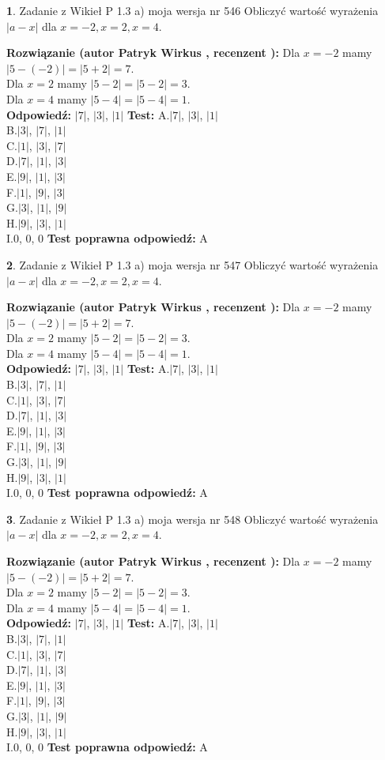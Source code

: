 \documentclass[12pt, a4paper]{article}
\theoremstyle{definition} %
\newtheorem{zad}{}
\newcommand{\zadStart}[1]{\begin{zad}#1\newline}
\newcommand{\zadStop}{\end{zad}}
\newcommand{\rozwStart}[2]{\noindent \textbf{Rozwiązanie (autor #1 , recenzent #2): }\newline}
\newcommand{\rozwStop}{\newline}
\newcommand{\odpStart}{\noindent \textbf{Odpowiedź:}\newline}
\newcommand{\odpStop}{\newline}
\newcommand{\testStart}{\noindent \textbf{Test:}\newline}
\newcommand{\testStop}{\newline}
\newcommand{\kluczStart}{\noindent \textbf{Test poprawna odpowiedź:}\newline}
\newcommand{\kluczStop}{\newline}
\begin{document}
\zadStart{Zadanie z Wikieł P 1.3 a) moja wersja nr 546}
Obliczyć wartość wyrażenia $|a - x|$ dla $x=-2,x=2,x=4$.
\zadStop
\rozwStart{Patryk Wirkus}{}
Dla $x = -2$ mamy $|5 - (-2)| = |5 + 2| = 7$.\\
Dla $x = 2$ mamy $|5 - 2| = |5 - 2| = 3$.\\
Dla $x = 4$ mamy $|5 - 4| = |5 - 4| = 1$.\\
\rozwStop
\odpStart
$|7|$, $|3|$, $|1|$
\odpStop
\testStart
A.$|7|$, $|3|$, $|1|$\\
B.$|3|$, $|7|$, $|1|$\\
C.$|1|$, $|3|$, $|7|$\\
D.$|7|$, $|1|$, $|3|$\\
E.$|9|$, $|1|$, $|3|$\\
F.$|1|$, $|9|$, $|3|$\\
G.$|3|$, $|1|$, $|9|$\\
H.$|9|$, $|3|$, $|1|$\\
I.$0$, $0$, $0$
\testStop
\kluczStart
A
\kluczStop



\zadStart{Zadanie z Wikieł P 1.3 a) moja wersja nr 547}
Obliczyć wartość wyrażenia $|a - x|$ dla $x=-2,x=2,x=4$.
\zadStop
\rozwStart{Patryk Wirkus}{}
Dla $x = -2$ mamy $|5 - (-2)| = |5 + 2| = 7$.\\
Dla $x = 2$ mamy $|5 - 2| = |5 - 2| = 3$.\\
Dla $x = 4$ mamy $|5 - 4| = |5 - 4| = 1$.\\
\rozwStop
\odpStart
$|7|$, $|3|$, $|1|$
\odpStop
\testStart
A.$|7|$, $|3|$, $|1|$\\
B.$|3|$, $|7|$, $|1|$\\
C.$|1|$, $|3|$, $|7|$\\
D.$|7|$, $|1|$, $|3|$\\
E.$|9|$, $|1|$, $|3|$\\
F.$|1|$, $|9|$, $|3|$\\
G.$|3|$, $|1|$, $|9|$\\
H.$|9|$, $|3|$, $|1|$\\
I.$0$, $0$, $0$
\testStop
\kluczStart
A
\kluczStop



\zadStart{Zadanie z Wikieł P 1.3 a) moja wersja nr 548}
Obliczyć wartość wyrażenia $|a - x|$ dla $x=-2,x=2,x=4$.
\zadStop
\rozwStart{Patryk Wirkus}{}
Dla $x = -2$ mamy $|5 - (-2)| = |5 + 2| = 7$.\\
Dla $x = 2$ mamy $|5 - 2| = |5 - 2| = 3$.\\
Dla $x = 4$ mamy $|5 - 4| = |5 - 4| = 1$.\\
\rozwStop
\odpStart
$|7|$, $|3|$, $|1|$
\odpStop
\testStart
A.$|7|$, $|3|$, $|1|$\\
B.$|3|$, $|7|$, $|1|$\\
C.$|1|$, $|3|$, $|7|$\\
D.$|7|$, $|1|$, $|3|$\\
E.$|9|$, $|1|$, $|3|$\\
F.$|1|$, $|9|$, $|3|$\\
G.$|3|$, $|1|$, $|9|$\\
H.$|9|$, $|3|$, $|1|$\\
I.$0$, $0$, $0$
\testStop
\kluczStart
A
\kluczStop
\end{document}
